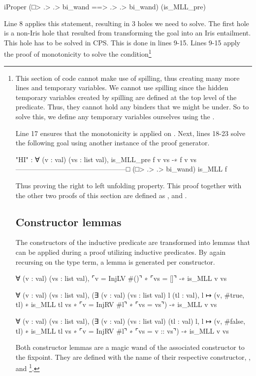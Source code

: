 \documentclass[thesis.tex]{subfiles}
\begin{document}
\begin{coqcode}
  iProper (□> .> .> bi_wand ==> .> .> bi_wand) 
          (is_MLL_pre)
\end{coqcode}
Line 8 applies this statement, resulting in 3 holes we need to solve. The first hole is a non-Iris hole that resulted from transforming the goal into an Iris entailment. This hole has to be solved in CPS. This is done in lines 9-15. Lines 9-15 apply the proof of monotonicity to solve the  condition\footnote{This section of code cannot make use of spilling, thus creating many more lines and temporary variables. We cannot use spilling since the hidden temporary variables created by spilling are defined at the top level of the predicate. Thus, they cannot hold any binders that we might be under. So to solve this, we define any temporary variables ourselves using the .

Line 17 ensures that the monotonicity is applied on . Next, lines 18-23 solve the following goal using another instance of the  proof generator.
\begin{coqcode}
  "HI" : ∀ (v : val) (vs : list val), 
          is_MLL_pre f v vs -∗ f v vs
  ------------------------------------------------□
  (□> .> .> bi_wand) is_MLL f
\end{coqcode}
Thus proving the right to left unfolding property. This proof together with the other two proofs of this section are defined as ,  and .

\section{Constructor lemmas}\label{sec:constrconstr}
The constructors of the inductive predicate are transformed into lemmas that can be applied during a proof utilizing inductive predicates. By again recursing on the type term, a lemma is generated per constructor.
\begin{coqcode}
  ∀ (v : val) (vs : list val),
    ⌜v = InjLV #()⌝ ∗ ⌜vs = []⌝ -∗ is_MLL v vs

  ∀ (v : val) (vs : list val),
    (∃ (v : val) (vs : list val) l (tl : val), 
          l ↦ (v, #true, tl) ∗ is_MLL tl vs ∗ 
          ⌜v = InjRV #l⌝ ∗ ⌜vs = vs⌝) 
       -∗ is_MLL v vs

  ∀ (v : val) (vs : list val),
    (∃ (v : val) (vs : list val) (tl : val) l, 
          l ↦ (v, #false, tl) ∗ is_MLL tl vs ∗ 
          ⌜v = InjRV #l⌝ ∗ ⌜vs = v :: vs⌝) 
       -∗ is_MLL v vs
\end{coqcode}
Both constructor lemmas are a magic wand of the associated constructor to the fixpoint. They are defined with the name of their respective constructor, ,  and \footnote{These constructors could be simplified by substituting using the equalities on lines 2, 7 and 13. However, this was not implemented in this thesis.}.

}
\end{document}
